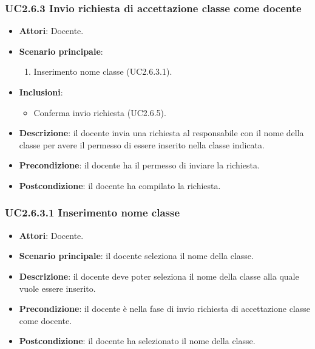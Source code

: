 \subsubsection{UC2.6.3 Invio richiesta di accettazione classe come docente}
\begin{itemize}
\item \textbf{Attori}: Docente.
\item \textbf{Scenario principale}:
\begin{enumerate}
\item Inserimento nome classe (UC2.6.3.1).
\end{enumerate}
\item \textbf{Inclusioni}:
\begin{itemize}
\item Conferma invio richiesta (UC2.6.5).
\end{itemize}
\item \textbf{Descrizione}: il docente invia una richiesta al responsabile con il nome della classe per avere il permesso di essere inserito nella classe indicata.
\item \textbf{Precondizione}: il docente ha il permesso di inviare la richiesta.
\item \textbf{Postcondizione}: il docente ha compilato la richiesta.
\end{itemize}
\subsubsection{UC2.6.3.1 Inserimento nome classe}
\begin{itemize}
\item \textbf{Attori}: Docente.
\item \textbf{Scenario principale}: il docente seleziona il nome della classe.
\item \textbf{Descrizione}: il docente deve poter seleziona il nome della classe alla quale vuole essere inserito.
\item \textbf{Precondizione}: il docente è nella fase di invio richiesta di accettazione classe come docente.
\item \textbf{Postcondizione}: il docente ha selezionato il nome della classe.
\end{itemize}
